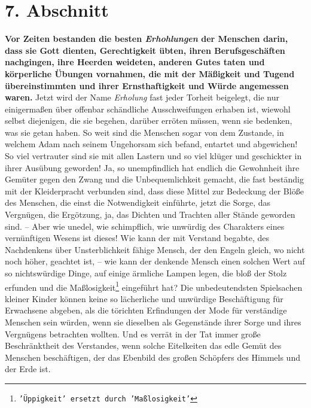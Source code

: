 \section{7. Abschnitt} \label{kap14_ab7}

\label{ref:14_07_wahre_nachfolger_erholung}
 \textbf{Vor Zeiten bestanden die
besten \textit{Erhohlungen} der Menschen darin, dass sie Gott
dienten, Gerechtigkeit übten, ihren Berufsgeschäften nachgingen, ihre Heerden
weideten, anderen Gutes taten und körperliche Übungen vornahmen, die mit der
Mäßigkeit und Tugend übereinstimmten und ihrer Ernsthaftigkeit und Würde
angemessen waren.} Jetzt wird der Name \textit{Erholung} fast jeder Torheit
beigelegt, die nur einigermaßen über offenbar schändliche Ausschweifungen
erhaben ist, wiewohl selbst diejenigen, die sie begehen, darüber erröten
müssen, wenn sie bedenken, was sie getan haben. So weit sind die Menschen sogar
von dem Zustande, in welchem Adam nach seinem Ungehorsam
sich befand, entartet
und abgewichen! So viel vertrauter sind sie mit allen Lastern und so viel klüger
und geschickter in ihrer Ausübung geworden! Ja, so unempfindlich hat endlich die
Gewohnheit ihre Gemüter gegen den Zwang und die Unbequemlichkeit gemacht, die
fast beständig mit der Kleiderpracht verbunden sind, dass diese Mittel zur
Bedeckung der Blöße des Menschen, die einst die Notwendigkeit einführte, jetzt
die Sorge, das Vergnügen, die Ergötzung, ja, das Dichten und Trachten aller
Stände geworden sind. -- Aber wie unedel, wie schimpflich, wie unwürdig des
Charakters eines vernünftigen Wesens ist dieses! Wie kann der mit Verstand
begabte, des Nachdenkens über Unsterblichkeit fähige Mensch, der den
Engeln
gleich, wo nicht noch höher, geachtet ist, -- wie kann der denkende Mensch einen
solchen Wert auf so nichtswürdige Dinge, auf einige ärmliche Lampen legen, die
bloß der Stolz erfunden und die Maßlosigkeit\footnote{\texttt{'Üppigkeit' ersetzt
durch 'Maßlosigkeit'}}
eingeführt hat? Die unbedeutendsten
Spielsachen kleiner Kinder können keine so lächerliche und
unwürdige
Beschäftigung für Erwachsene abgeben, als die törichten Erfindungen der Mode
für verständige Menschen sein würden, wenn sie dieselben als Gegenstände ihrer
Sorge und ihres Vergnügens betrachten wollten. Und es verrät in der Tat immer
große Beschränktheit des Verstandes, wenn solche Eitelkeiten das edle Gemüt des
Menschen beschäftigen, der das Ebenbild des großen Schöpfers des Himmels und der
Erde ist.

